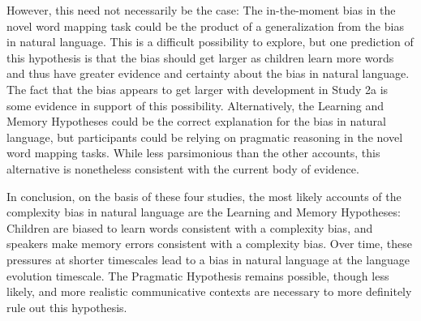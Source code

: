 However, this need not necessarily be the case: The in-the-moment bias in the novel word mapping task could be the product of a generalization from the bias in natural language. This is a difficult possibility to explore, but one prediction of this hypothesis is that the bias should get larger as children learn more words and thus have greater evidence and certainty about the bias in natural language. The fact that the bias appears to get larger with development in Study 2a is some evidence in support of this possibility. Alternatively, the Learning and Memory Hypotheses could be the correct explanation for the bias in natural language, but participants could  be relying on pragmatic reasoning in the novel word mapping tasks.  While less parsimonious than the other accounts, this alternative is nonetheless consistent with the current body of evidence.

In conclusion, on the basis of these four studies, the most likely accounts of the complexity bias in natural language are the Learning and Memory Hypotheses: Children are biased to learn words consistent with a complexity bias, and speakers make memory errors consistent with a complexity bias. Over time, these pressures at shorter timescales lead to a bias in natural language at the language evolution timescale. The Pragmatic Hypothesis remains possible, though less likely, and more realistic communicative contexts are necessary to more definitely rule out this hypothesis.




%



